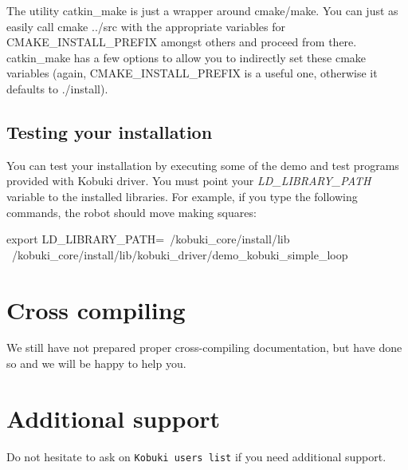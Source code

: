 

\-The utility catkin\-\_\-make is just a wrapper around cmake/make. \-You can just as easily call cmake ../src with the appropriate variables for \-C\-M\-A\-K\-E\-\_\-\-I\-N\-S\-T\-A\-L\-L\-\_\-\-P\-R\-E\-F\-I\-X amongst others and proceed from there. catkin\-\_\-make has a few options to allow you to indirectly set these cmake variables (again, \-C\-M\-A\-K\-E\-\_\-\-I\-N\-S\-T\-A\-L\-L\-\_\-\-P\-R\-E\-F\-I\-X is a useful one, otherwise it defaults to ./install).\subsection{\-Testing your installation}\label{enInstallationLinuxGuide_test}
\-You can test your installation by executing some of the demo and test programs provided with \-Kobuki driver. \-You must point your {\itshape \-L\-D\-\_\-\-L\-I\-B\-R\-A\-R\-Y\-\_\-\-P\-A\-T\-H\/} variable to the installed libraries. \-For example, if you type the following commands, the robot should move making squares\-:


\begin{DoxyCode}
  export LD_LIBRARY_PATH=~/kobuki_core/install/lib
  ~/kobuki_core/install/lib/kobuki_driver/demo_kobuki_simple_loop
\end{DoxyCode}
\section{\-Cross compiling}\label{enInstallationLinuxGuide_crossc}
\-We still have not prepared proper cross-\/compiling documentation, but have done so and we will be happy to help you.\section{\-Additional support}\label{enInstallationLinuxGuide_support}
\-Do not hesitate to ask on {\tt \-Kobuki users list} if you need additional support. 